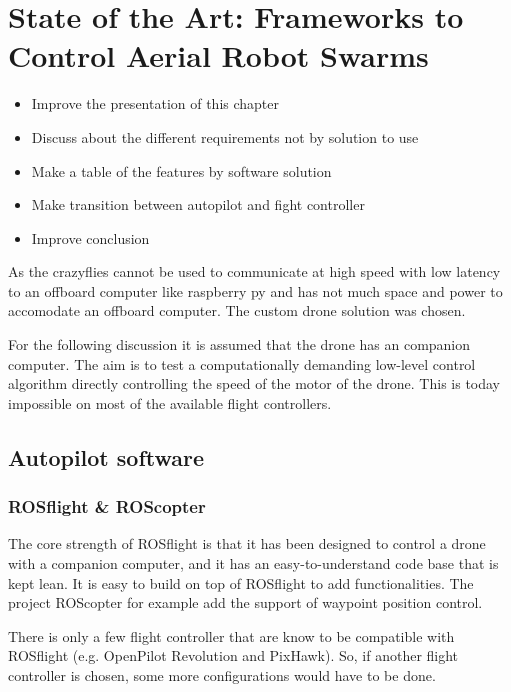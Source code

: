 \chapter{State of the Art: Frameworks to Control Aerial Robot Swarms}

{\color{red}
\begin{itemize}
    \item Improve the presentation of this chapter
    \item Discuss about the different requirements not by solution to use
    \item Make a table of the features by software solution
    \item Make transition between autopilot and fight controller
    \item Improve conclusion
\end{itemize}
}


As the crazyflies cannot be used to communicate at high speed with low latency to an offboard computer like raspberry py and has not much space and power to accomodate an offboard computer.
The custom drone solution was chosen.




For the following discussion it is assumed that the drone has an companion computer.
The aim is to test a computationally demanding low-level control algorithm directly controlling the speed of the motor of the drone. This is today impossible on most of the available flight controllers.

\section{Autopilot software}

\subsection{ROSflight \& ROScopter}
The core strength of ROSflight is that it has been designed to control a drone with a companion computer, and it has an easy-to-understand code base that is kept lean.
It is easy to build on top of ROSflight to add functionalities. The project ROScopter \cite{github_roscopter} for example add the support of waypoint position control.

There is only a few flight controller that are know to be compatible with ROSflight (e.g. OpenPilot Revolution and PixHawk).
So, if another flight controller is chosen, some more configurations would have to be done.

